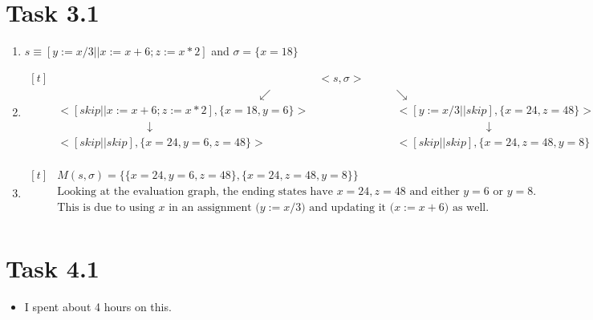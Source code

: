 \documentclass{article}
\newcommand{\answer}{\item[]} %
\begin{document}
	\section{Task 3.1}
		\begin{enumerate}[label = {(\alph*)}]
			
			\answer $s \equiv [y := x / 3 || x := x + 6 ; z := x * 2]$ and $\sigma = \{x = 18\}$ 
			
			\item
			$\begin{aligned}[t]
				&\qquad &<s, \sigma> \qquad & \\
				&\qquad \qquad \qquad \qquad \qquad \qquad \qquad \qquad \qquad \swarrow & &\searrow \\
				&<[skip || x := x + 6; z := x * 2], \{x = 18, y = 6\}> & &<[y := x / 3 || skip], \{x = 24, z = 48\}> \\
				&\qquad \qquad \qquad \qquad \downarrow & &\qquad \qquad \qquad \qquad \downarrow \\
				&<[skip || skip], \{x = 24, y = 6, z = 48\}> & &<[skip || skip], \{x = 24, z = 48, y = 8\}> \\
			\end{aligned}$
			
			\item
			$\begin{aligned}[t]
				&M(s, \sigma) = \{\{x = 24, y = 6, z = 48\}, \{x = 24, z = 48, y = 8\}\} \\
				&\text{Looking at the evaluation graph, the ending states have $x = 24, z = 48$ and either $y = 6$ or $y = 8$.} \\
				&\text{This is due to using $x$ in an assignment ($y := x / 3$) and updating it ($x := x + 6$) as well.} \\ 
			\end{aligned}$
			
		\end{enumerate}
	
	\section{Task 4.1}
		\begin{itemize}
			
			\answer I spent about 4 hours on this.
			
		\end{itemize}
	
\end{document}
